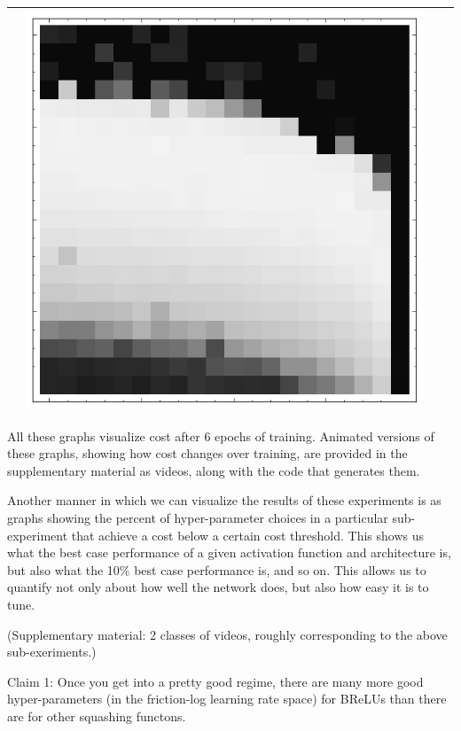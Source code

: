 \documentclass[10pt]{article}
\begin{document}
\begin{tabular}{|c|c|c|c|}
        & \includegraphics[scale=0.25]{plots/simple/LF-40B20B10B-20T10-MNIST-6.png} \\ \hline
\end{tabular}

All these graphs visualize cost after 6 epochs of training. Animated
versions of these graphs, showing how cost changes over training, are
provided in the supplementary material as videos, along with the code
that generates them.

Another manner in which we can visualize the results of these
experiments is as graphs showing the percent of hyper-parameter 
choices in a particular sub-experiment that achieve a cost below a
certain cost threshold. This shows us what the best case performance
of a given activation function and architecture is, but also what the
10\% best case performance is, and so on. This allows us to quantify
not only about how well the network does, but also how easy it is to
tune.




(Supplementary material: 2 classes of videos, roughly corresponding to
the above sub-exeriments.)


Claim 1: Once you get into a pretty good regime, there are many more
good hyper-parameters (in the friction-log learning rate space) for
BReLUs than there are for other squashing functons.  
\end{document}
